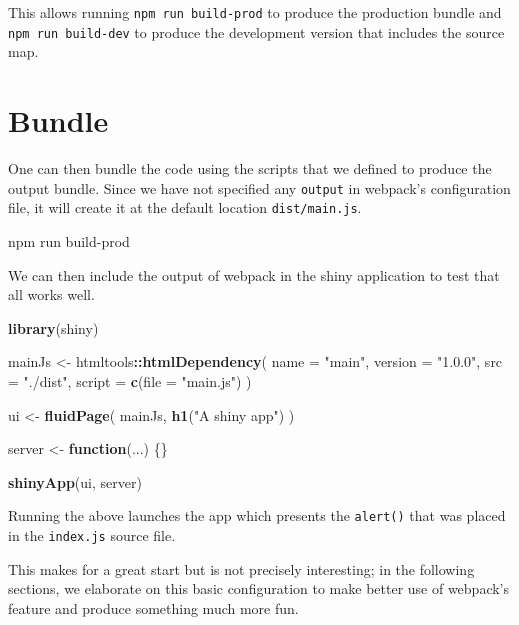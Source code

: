 \documentclass[10pt,]{krantz}
\makeatletter
\newenvironment{Shaded}{\begin{snugshade}}{\end{snugshade}}
\newcommand{\ControlFlowTok}[1]{\textcolor[rgb]{0.27,0.27,0.27}{\textbf{#1}}}
\newcommand{\DataTypeTok}[1]{\textcolor[rgb]{0.27,0.27,0.27}{#1}}
\newcommand{\ExtensionTok}[1]{#1}
\newcommand{\KeywordTok}[1]{\textcolor[rgb]{0.27,0.27,0.27}{\textbf{#1}}}
\newcommand{\NormalTok}[1]{#1}
\newcommand{\OperatorTok}[1]{\textcolor[rgb]{0.43,0.43,0.43}{\textbf{#1}}}
\newcommand{\StringTok}[1]{\textcolor[rgb]{0.5,0.5,0.5}{#1}}
\newenvironment{kframe}{%
\medskip{}
\setlength{\fboxsep}{.8em}
 \def\at@end@of@kframe{}%
 \ifinner\ifhmode%
  \def\at@end@of@kframe{\end{minipage}}%
  \begin{minipage}{\columnwidth}%
 \fi\fi%
 \def\FrameCommand##1{\hskip\@totalleftmargin \hskip-\fboxsep
 \colorbox{shadecolor}{##1}\hskip-\fboxsep
     \hskip-\linewidth \hskip-\@totalleftmargin \hskip\columnwidth}%
 \MakeFramed {\advance\hsize-\width
   \@totalleftmargin\z@ \linewidth\hsize
   \@setminipage}}%
 {\par\unskip\endMakeFramed%
 \at@end@of@kframe}
\renewenvironment{Shaded}{\begin{kframe}}{\end{kframe}}
\makeatother
\begin{document}
This allows running \texttt{npm\ run\ build-prod} to produce the production bundle and \texttt{npm\ run\ build-dev} to produce the development version that includes the source map.

\hypertarget{webpack-intro-bundle}{%
\section{Bundle}\label{webpack-intro-bundle}}

One can then bundle the code using the scripts that we defined to produce the output bundle. Since we have not specified any \texttt{output} in webpack's configuration file, it will create it at the default location \texttt{dist/main.js}.

\begin{Shaded}
\begin{Highlighting}[]
\ExtensionTok{npm}\NormalTok{ run build-prod}
\end{Highlighting}
\end{Shaded}

We can then include the output of webpack in the shiny application to test that all works well.

\begin{Shaded}
\begin{Highlighting}[]
\KeywordTok{library}\NormalTok{(shiny)}

\NormalTok{mainJs <-}\StringTok{ }\NormalTok{htmltools}\OperatorTok{::}\KeywordTok{htmlDependency}\NormalTok{(}
  \DataTypeTok{name =} \StringTok{"main"}\NormalTok{,}
  \DataTypeTok{version =} \StringTok{"1.0.0"}\NormalTok{,}
  \DataTypeTok{src =} \StringTok{"./dist"}\NormalTok{,}
  \DataTypeTok{script =} \KeywordTok{c}\NormalTok{(}\DataTypeTok{file =} \StringTok{"main.js"}\NormalTok{)}
\NormalTok{)}

\NormalTok{ui <-}\StringTok{ }\KeywordTok{fluidPage}\NormalTok{(}
\NormalTok{  mainJs,}
  \KeywordTok{h1}\NormalTok{(}\StringTok{"A shiny app"}\NormalTok{)}
\NormalTok{)}

\NormalTok{server <-}\StringTok{ }\ControlFlowTok{function}\NormalTok{(...) \{\}}

\KeywordTok{shinyApp}\NormalTok{(ui, server)}
\end{Highlighting}
\end{Shaded}

Running the above launches the app which presents the \texttt{alert()} that was placed in the \texttt{index.js} source file.

This makes for a great start but is not precisely interesting; in the following sections, we elaborate on this basic configuration to make better use of webpack's feature and produce something much more fun.
\end{document}
